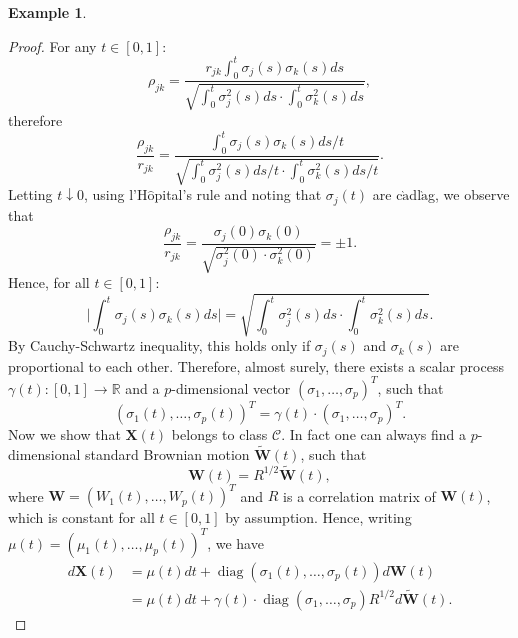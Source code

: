 \documentclass[a4paper,11pt]{article}
\theoremstyle{plain}
\theoremstyle{definition}
\newtheorem{exmp}[thm]{Example}
\newcommand{\MR}{\mathbb{R}}
\newcommand{\diag}{\operatorname{diag}}
\begin{document}
\begin{exmp}
    	\begin{proof}
    		For any $t \in [0, 1]$: 
    		\[ \rho_{jk} = \frac{r_{jk} \int_{0}^{t} \sigma_j(s) \sigma_k(s) ds }{\sqrt{\int_{0}^{t} \sigma_j^2(s) ds \cdot \int_{0}^{t} \sigma_k^2(s) ds}}, \]
    		therefore
    		\[ \frac{\rho_{jk}}{r_{jk}} = \frac{\int_{0}^{t} \sigma_j(s) \sigma_k(s) ds/t }{\sqrt{\int_{0}^{t} \sigma_j^2(s) ds/t \cdot \int_{0}^{t} \sigma_k^2(s) ds/t}}. \]
    		Letting $t \downarrow 0$, using l'H$\hat{\text{o}}$pital's rule and noting that $\sigma_j(t)$ are c$\grave{\text{a}}$dl$\grave{\text{a}}$g, we observe that
    		\[ \frac{\rho_{jk}}{r_{jk}} = \frac{\sigma_j(0) \sigma_k(0)}{ \sqrt{\sigma_j^2(0) \cdot \sigma_k^2(0) }} = \pm 1. \]
    		Hence, for all $t \in [0, 1]$:
    		\[ \bigg| \int_{0}^{t}\sigma_j(s) \sigma_k(s) ds \bigg| = \sqrt{\int_{0}^{t} \sigma_j^2(s) ds \cdot \int_{0}^{t} \sigma_k^2(s) ds} . \]
    		By Cauchy-Schwartz inequality, this holds only if $\sigma_j(s)$ and $\sigma_k(s)$ are proportional to each other. Therefore, almost surely, there exists a scalar process $\gamma(t) : [0, 1] \rightarrow \MR$ and a $p$-dimensional vector $(\sigma_1, \dots, \sigma_p)^T$, such that
    		\[ (\sigma_1(t), \dots, \sigma_p(t))^T = \gamma(t) \cdot (\sigma_1, \dots, \sigma_p)^T. \]
    		Now we show that $\mathbf{X}(t)$ belongs to class $\mathcal{C}$. In fact one can always find a $p$-dimensional standard Brownian motion $\widetilde{\mathbf{W}}(t)$, such that 
    		\[ \mathbf{W}(t) = R^{1/2}\widetilde{\mathbf{W}}(t), \]
    		where $\mathbf{W} = (W_1(t), \dots, W_p(t))^T$ and $R$ is a correlation matrix of $\mathbf{W}(t)$, which is constant for all $t \in [0, 1]$ by assumption. Hence, writing $\mu(t) = (\mu_1(t), \dots, \mu_p(t))^T$, we have
    		\[ 
    		\begin{aligned}
    		d\mathbf{X}(t) & = \mu(t) dt + \diag(\sigma_1(t), \dots, \sigma_p(t)) d\mathbf{W}(t) \\
    		&  = \mu(t) dt +\gamma(t) \cdot \diag(\sigma_1, \dots, \sigma_p) R^{1/2} d\widetilde{\mathbf{W}}(t).
    		\end{aligned} \]
    	\end{proof}
    \end{exmp}
    
\end{document}
